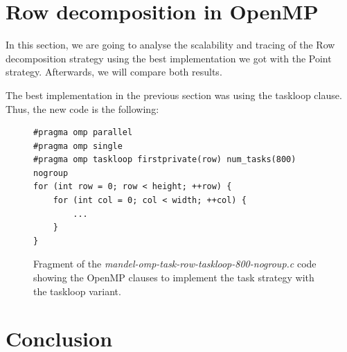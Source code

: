 \documentclass[12pt, a4paper]{article}
\begin{document}
\section{Row decomposition in OpenMP}

In this section, we are going to analyse the scalability and tracing of the Row decomposition strategy using the best implementation we got with the Point strategy. Afterwards, we will compare both results.

The best implementation in the previous section was using the taskloop clause. Thus, the new code is the following:

\begin{figure}[H]
\begin{lstlisting}
#pragma omp parallel
#pragma omp single
#pragma omp taskloop firstprivate(row) num_tasks(800) nogroup
for (int row = 0; row < height; ++row) {
    for (int col = 0; col < width; ++col) {
        ...
	}
}
\end{lstlisting}
\caption{Fragment of the \textit{mandel-omp-task-row-taskloop-800-nogroup.c} code showing the OpenMP clauses to implement the task strategy with the taskloop variant.}
\label{code:task_implementation_row_taskloop_800}
\end{figure}


\section{Conclusion}
\end{document}
